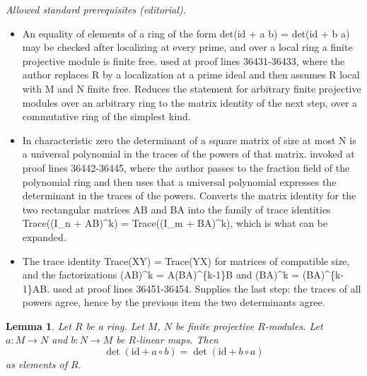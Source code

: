 \documentclass[10pt,a4paper]{amsart}
\theoremstyle{plain}
\newtheorem{lemma}[subsection]{Lemma}
\theoremstyle{definition}
\theoremstyle{remark}
\numberwithin{equation}{subsection}
\begin{document}
\noindent\textit{Allowed standard prerequisites (editorial).}\begin{itemize}
\item An equality of elements of a ring of the form det(id + a b) = det(id + b a) may be checked after localizing at every prime, and over a local ring a finite projective module is finite free. used at proof lines 36431-36433, where the author replaces R by a localization at a prime ideal and then assumes R local with M and N finite free. Reduces the statement for arbitrary finite projective modules over an arbitrary ring to the matrix identity of the next step, over a commutative ring of the simplest kind.
\item In characteristic zero the determinant of a square matrix of size at most N is a universal polynomial in the traces of the powers of that matrix. invoked at proof lines 36442-36445, where the author passes to the fraction field of the polynomial ring and then uses that a universal polynomial expresses the determinant in the traces of the powers. Converts the matrix identity for the two rectangular matrices AB and BA into the family of trace identities Trace((I\_n + AB)\textasciicircum{}k) = Trace((I\_m + BA)\textasciicircum{}k), which is what can be expanded.
\item The trace identity Trace(XY) = Trace(YX) for matrices of compatible size, and the factorizations (AB)\textasciicircum{}k = A(BA)\textasciicircum{}\{k-1\}B and (BA)\textasciicircum{}k = (BA)\textasciicircum{}\{k-1\}AB. used at proof lines 36451-36454. Supplies the last step: the traces of all powers agree, hence by the previous item the two determinants agree.
\end{itemize}\medskip
\begin{lemma}
\label{lemma-det-switch}
Let $R$ be a ring. Let $M$, $N$ be finite projective $R$-modules.
Let $a : M \to N$ and $b : N \to M$ be $R$-linear maps.
Then
$$
\det(\text{id} + a \circ b) = \det(\text{id} + b \circ a)
$$
as elements of $R$.
\end{lemma}
\end{document}
